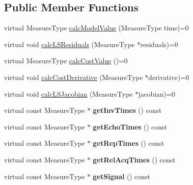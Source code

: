 \subsection*{Public Member Functions}
\begin{DoxyCompactItemize}
\item 
virtual Measure\-Type \hyperlink{class_ox_1_1_functions_t1_a2d5f4c9296daf3531e30a562348ad474}{calc\-Model\-Value} (Measure\-Type time)=0
\item 
virtual void \hyperlink{class_ox_1_1_functions_t1_a6c69a4159a92c4ddb71ecba97fcdf6de}{calc\-L\-S\-Residuals} (Measure\-Type $\ast$residuals)=0
\item 
virtual Measure\-Type \hyperlink{class_ox_1_1_functions_t1_af1475834e89c9304a96c776f3d5aacbf}{calc\-Cost\-Value} ()=0
\item 
virtual void \hyperlink{class_ox_1_1_functions_t1_a413b0afca183b88613070ae87121ca66}{calc\-Cost\-Derivative} (Measure\-Type $\ast$derivative)=0
\item 
virtual void \hyperlink{class_ox_1_1_functions_t1_a84e268911eb64919129c8a0cea39344d}{calc\-L\-S\-Jacobian} (Measure\-Type $\ast$jacobian)=0
\item 
\hypertarget{class_ox_1_1_functions_t1_a71aafa53236bc1eed5b4d65ae25538c7}{virtual const Measure\-Type $\ast$ {\bfseries get\-Inv\-Times} () const }\label{class_ox_1_1_functions_t1_a71aafa53236bc1eed5b4d65ae25538c7}

\item 
\hypertarget{class_ox_1_1_functions_t1_a73a26e9e37e35c1617a741ad2932bdd8}{virtual const Measure\-Type $\ast$ {\bfseries get\-Echo\-Times} () const }\label{class_ox_1_1_functions_t1_a73a26e9e37e35c1617a741ad2932bdd8}

\item 
\hypertarget{class_ox_1_1_functions_t1_afb89e35bedfd9d608b0afe189d976fa9}{virtual const Measure\-Type $\ast$ {\bfseries get\-Rep\-Times} () const }\label{class_ox_1_1_functions_t1_afb89e35bedfd9d608b0afe189d976fa9}

\item 
\hypertarget{class_ox_1_1_functions_t1_a142aaed9ff99a0dd08460d2581150e9c}{virtual const Measure\-Type $\ast$ {\bfseries get\-Rel\-Acq\-Times} () const }\label{class_ox_1_1_functions_t1_a142aaed9ff99a0dd08460d2581150e9c}

\item 
\hypertarget{class_ox_1_1_functions_t1_adf70d696e9da0fcdb45c4a4d02913d6c}{virtual const Measure\-Type $\ast$ {\bfseries get\-Signal} () const }\label{class_ox_1_1_functions_t1_adf70d696e9da0fcdb45c4a4d02913d6c}


\end{DoxyCompactItemize}
